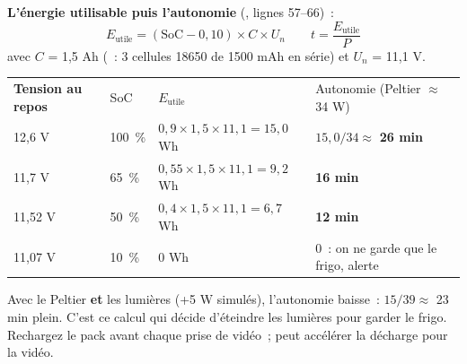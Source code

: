 \textbf{L'énergie utilisable puis l'autonomie} (, lignes 57--66)~:
\[ E_{\text{utile}} = (\mathrm{SoC} - 0{,}10) \times C \times U_n \qquad t = \frac{E_{\text{utile}}}{P} \]
avec $C$ = 1,5 Ah (~: 3 cellules 18650 de 1500 mAh en série) et $U_n$ = 11,1 V.

\begin{tabularx}{\linewidth}{P{2.8cm}P{2.2cm}P{3.6cm}L}
 \textbf{Tension au repos} & SoC & $E_{\text{utile}}$ & Autonomie (Peltier $\approx$ 34 W) \\
12,6 V & 100~\% & $0{,}9 \times 1{,}5 \times 11{,}1 = 15{,}0$ Wh & $15{,}0/34 \approx$ \textbf{26 min} \\
11,7 V & 65~\% & $0{,}55 \times 1{,}5 \times 11{,}1 = 9{,}2$ Wh & \textbf{16 min} \\
11,52 V & 50~\% & $0{,}4 \times 1{,}5 \times 11{,}1 = 6{,}7$ Wh & \textbf{12 min} \\
11,07 V & 10~\% & 0 Wh & 0~: on ne garde que le frigo, alerte \\
\end{tabularx}
Avec le Peltier \textbf{et} les lumières (+5 W simulés), l'autonomie baisse~: $15/39 \approx$ 23 min plein. C'est ce calcul qui décide d'éteindre les lumières pour garder le frigo. Rechargez le pack avant chaque prise de vidéo~;  peut accélérer la décharge pour la vidéo.


